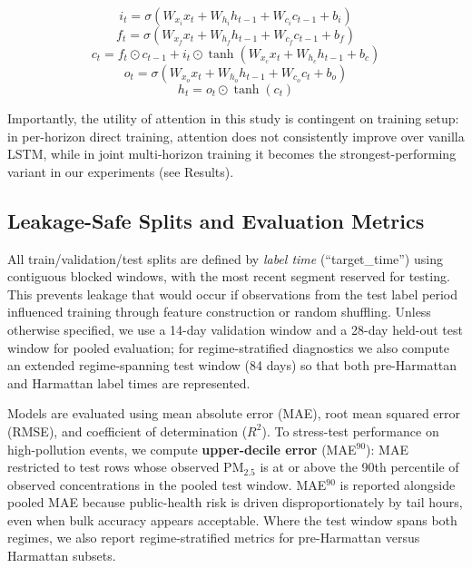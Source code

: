 \documentclass[a4paper,fleqn]{cas-sc}
\begin{document}
\begin{equation}
i_t = \sigma \left( W_{x_i} x_t + W_{h_i} h_{t-1} + W_{c_i} c_{t-1} + b_i\right)
\label{equ1}
\end{equation}
\begin{equation}
f_t = \sigma\left(W_{x_f} x_t + W_{h_f} h_{t-1} + W_{c_f} c_{t-1} + b_f\right)
\label{equ2}
\end{equation}
\begin{equation}
c_t = f_t \odot c_{t-1} + i_t \odot \tanh\left(W_{x_c} x_t + W_{h_c} h_{t-1} + b_c\right)
\label{equ3}
\end{equation}
\begin{equation}
o_t = \sigma\left(W_{x_o} x_t + W_{h_o} h_{t-1} + W_{c_o} c_t + b_o\right)
\label{equ4}
\end{equation}
\begin{equation}
h_t = o_t \odot \tanh\left(c_t\right)
\label{equ5}
\end{equation}

Importantly, the utility of attention in this study is contingent on training setup: in per-horizon direct training, attention does not consistently improve over vanilla LSTM, while in joint multi-horizon training it becomes the strongest-performing variant in our experiments (see Results).

\subsection{Leakage-Safe Splits and Evaluation Metrics}

All train/validation/test splits are defined by \emph{label time} (``target\_time'') using contiguous blocked windows, with the most recent segment reserved for testing. This prevents leakage that would occur if observations from the test label period influenced training through feature construction or random shuffling. Unless otherwise specified, we use a 14-day validation window and a 28-day held-out test window for pooled evaluation; for regime-stratified diagnostics we also compute an extended regime-spanning test window (84 days) so that both pre-Harmattan and Harmattan label times are represented.

Models are evaluated using mean absolute error (MAE), root mean squared error (RMSE), and coefficient of determination (\(R^2\)). To stress-test performance on high-pollution events, we compute \textbf{upper-decile error} (MAE$^{90}$): MAE restricted to test rows whose observed PM$_{2.5}$ is at or above the 90th percentile of observed concentrations in the pooled test window. MAE$^{90}$ is reported alongside pooled MAE because public-health risk is driven disproportionately by tail hours, even when bulk accuracy appears acceptable. Where the test window spans both regimes, we also report regime-stratified metrics for pre-Harmattan versus Harmattan subsets.
\end{document}
